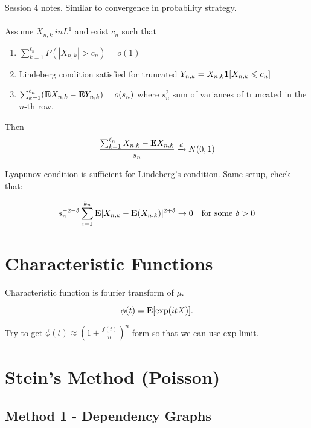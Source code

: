 \documentclass{article}
\begin{document}
\begin{recipe}
Session 4 notes. Similar to convergence in probability strategy. \\\\
Assume $X_{n,k} \ in L^1$ and exist $c_n$ such that 

\begin{enumerate}
	\item $\sum_{k=1}^{\ell_n} P(|X_{n,k}| > c_n) = o(1)$
	\item Lindeberg condition satisfied for truncated $Y_{n,k} =X_{n,k} \boldsymbol{1} [X_{n,k} \leqslant c_n]$
	\item $\sum_{k=1}^{\ell_n} (\mathbf{E} X_{n,k} - \mathbf{E} Y_{n,k}) = o(s_n)$ where $s_n^2$ sum of variances of truncated in the $n$-th row.
\end{enumerate}
Then $$\frac{\sum_{k=1}^{\ell_n} X_{n,k} - \mathbf{E} X_{n,k}}{s_n} \xrightarrow{d} N(0,1)$$
\end{recipe}
\begin{theorem}
Lyapunov condition is sufficient for Lindeberg's condition. Same setup, check that:


$$s_n^{-2-\delta} \sum_{i=1}^{k_n} \mathbf{E} |X_{n,k} - \mathbf{E} (X_{n,k})|^{2+\delta} \to 0 \quad \text{for some } \delta > 0$$
\end{theorem}



\section{Characteristic Functions}
\begin{definition}
Characteristic function is fourier transform of $\mu$. 

$$\phi(t) = \mathbf{E} [\exp(itX)].$$


\begin{recipe}
Try to get $\phi(t) \approx (1+ \frac{f(t)}{n})^n$ form so that we can use exp limit. 
\end{recipe}
\end{definition}




\section{Stein's Method (Poisson)}




\subsection{Method 1 - Dependency Graphs}
\end{document}
